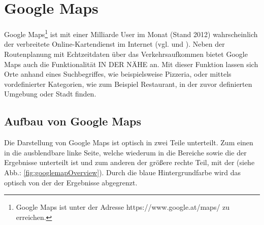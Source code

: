 \documentclass[../Bachelorarbeit.tex]{subfiles}
\begin{document}

\section{Google Maps}
\label{chap:analyse:sec:sota:sec:google_maps}
Google Maps\footnote{
	Google Maps ist unter der Adresse https://www.google.at/maps/ zu erreichen. 
} ist mit einer Milliarde User im Monat (Stand 2012) wahrscheinlich der verbreitete Online-Kartendienst im Internet (vgl. \cite{McClendonGoogleMapsBlog} und \cite{McClendonYoutube}).  
Neben der Routenplanung mit Echtzeitdaten über das Verkehrsaufkommen bietet Google Maps auch die Funktionalität IN DER NÄHE an.
Mit dieser Funktion lassen sich Orte anhand eines Suchbegriffes, wie beispielsweise Pizzeria, oder mittels vordefinierter Kategorien, wie zum Beispiel Restaurant, in der zuvor definierten Umgebung oder Stadt finden.


\subsection{Aufbau von Google Maps}
Die Darstellung von Google Maps ist optisch in zwei Teile unterteilt.
Zum einen in die ausblendbare linke Seite, welche wiederum in die Bereiche  sowie die  der Ergebnisse unterteilt ist und zum anderen der größere rechte Teil, mit der (siehe Abb.: \ref{fig:googlemapOverview}).
Durch die blaue Hintergrundfarbe wird das  optisch von der  der Ergebnisse abgegrenzt.
\end{document}
